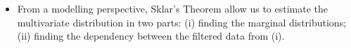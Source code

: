 \documentclass[pdf,9pt,xcolor=dvipsnames,hide notes]{beamer}
\begin{document}
\begin{frame}[label=frame4b]
\begin{itemize}
		\vspace{0.3cm}
%		
		
		\vspace{0.3cm}
			
		\item From a modelling perspective, Sklar's Theorem allow us to estimate the multivariate distribution in two parts: (i) finding the marginal distributions; (ii) finding the dependency between the filtered data from (i).
		
	\end{itemize}
\end{frame}

%	

%		

%		
%	
%		
%
%	
%	
%		
%		
\end{document}
